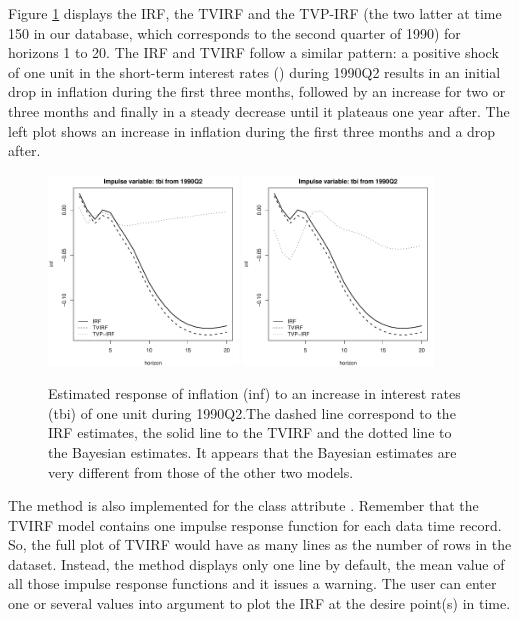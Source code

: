 Figure \ref{fig:USMACRO} displays the IRF, the TVIRF and the TVP-IRF (the two latter at time 150 in our database, which corresponds to the second quarter of 1990) for horizons 1 to 20. The IRF and TVIRF follow a similar pattern: a positive shock of one unit in the short-term interest rates () during 1990Q2 results in an initial drop in inflation during the first three months, followed by an increase for two or three months and finally in a steady decrease until it plateaus one year after. The left plot shows an increase in inflation during the first three months and a drop after. 
\begin{figure}[!ht]
\centering
\includegraphics[width = 0.45\textwidth]{Fig5}
\includegraphics[width = 0.45\textwidth]{Fig6}
\caption{Estimated response of inflation (inf) to an increase in interest rates (tbi) of one unit during 1990Q2.The dashed line correspond to the IRF estimates, the solid line to the TVIRF and the dotted line to the Bayesian estimates. It appears that the Bayesian estimates are very different from those of the other two models.\label{fig:USMACRO}}
\end{figure}

The  method is also implemented for the class attribute . Remember that the TVIRF model contains one impulse response function for each data time record. So, the full plot of TVIRF would have as many lines as the number of rows in the dataset. Instead, the  method displays only one line by default, the mean value of all those impulse response functions and it issues a warning. The user can enter one or several values into argument  to plot the IRF at the desire point(s) in time.


